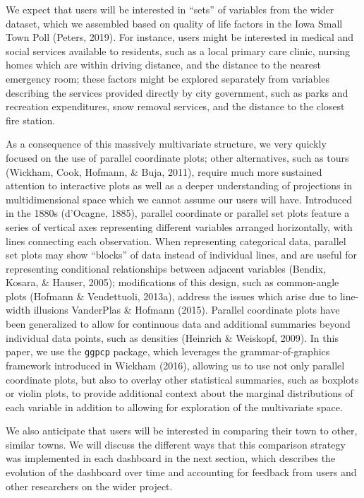 \documentclass[print]{nuthesis}
\begin{document}
We expect that users will be interested in ``sets'' of variables from the wider dataset, which we assembled based on quality of life factors in the Iowa Small Town Poll (Peters, 2019). For instance, users might be interested in medical and social services available to residents, such as a local primary care clinic, nursing homes which are within driving distance, and the distance to the nearest emergency room; these factors might be explored separately from variables describing the services provided directly by city government, such as parks and recreation expenditures, snow removal services, and the distance to the closest fire station.

As a consequence of this massively multivariate structure, we very quickly focused on the use of parallel coordinate plots; other alternatives, such as tours (Wickham, Cook, Hofmann, \& Buja, 2011), require much more sustained attention to interactive plots as well as a deeper understanding of projections in multidimensional space which we cannot assume our users will have. Introduced in the 1880s (d'Ocagne, 1885), parallel coordinate or parallel set plots feature a series of vertical axes representing different variables arranged horizontally, with lines connecting each observation. When representing categorical data, parallel set plots may show ``blocks'' of data instead of individual lines, and are useful for representing conditional relationships between adjacent variables (Bendix, Kosara, \& Hauser, 2005); modifications of this design, such as common-angle plots (Hofmann \& Vendettuoli, 2013a), address the issues which arise due to line-width illusions VanderPlas \& Hofmann (2015). Parallel coordinate plots have been generalized to allow for continuous data and additional summaries beyond individual data points, such as densities (Heinrich \& Weiskopf, 2009). In this paper, we use the \texttt{ggpcp} package, which leverages the grammar-of-graphics framework introduced in Wickham (2016), allowing us to use not only parallel coordinate plots, but also to overlay other statistical summaries, such as boxplots or violin plots, to provide additional context about the marginal distributions of each variable in addition to allowing for exploration of the multivariate space.

We also anticipate that users will be interested in comparing their town to other, similar towns. We will discuss the different ways that this comparison strategy was implemented in each dashboard in the next section, which describes the evolution of the dashboard over time and accounting for feedback from users and other researchers on the wider project.
\end{document}
